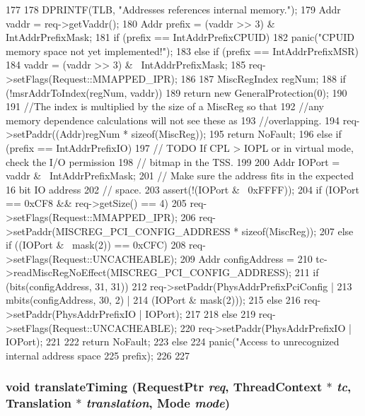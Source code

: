 \begin{DoxyCode}
177 {
178     DPRINTF(TLB, "Addresses references internal memory.\n");
179     Addr vaddr = req->getVaddr();
180     Addr prefix = (vaddr >> 3) & IntAddrPrefixMask;
181     if (prefix == IntAddrPrefixCPUID) {
182         panic("CPUID memory space not yet implemented!\n");
183     } else if (prefix == IntAddrPrefixMSR) {
184         vaddr = (vaddr >> 3) & ~IntAddrPrefixMask;
185         req->setFlags(Request::MMAPPED_IPR);
186 
187         MiscRegIndex regNum;
188         if (!msrAddrToIndex(regNum, vaddr))
189             return new GeneralProtection(0);
190 
191         //The index is multiplied by the size of a MiscReg so that
192         //any memory dependence calculations will not see these as
193         //overlapping.
194         req->setPaddr((Addr)regNum * sizeof(MiscReg));
195         return NoFault;
196     } else if (prefix == IntAddrPrefixIO) {
197         // TODO If CPL > IOPL or in virtual mode, check the I/O permission
198         // bitmap in the TSS.
199 
200         Addr IOPort = vaddr & ~IntAddrPrefixMask;
201         // Make sure the address fits in the expected 16 bit IO address
202         // space.
203         assert(!(IOPort & ~0xFFFF));
204         if (IOPort == 0xCF8 && req->getSize() == 4) {
205             req->setFlags(Request::MMAPPED_IPR);
206             req->setPaddr(MISCREG_PCI_CONFIG_ADDRESS * sizeof(MiscReg));
207         } else if ((IOPort & ~mask(2)) == 0xCFC) {
208             req->setFlags(Request::UNCACHEABLE);
209             Addr configAddress =
210                 tc->readMiscRegNoEffect(MISCREG_PCI_CONFIG_ADDRESS);
211             if (bits(configAddress, 31, 31)) {
212                 req->setPaddr(PhysAddrPrefixPciConfig |
213                         mbits(configAddress, 30, 2) |
214                         (IOPort & mask(2)));
215             } else {
216                 req->setPaddr(PhysAddrPrefixIO | IOPort);
217             }
218         } else {
219             req->setFlags(Request::UNCACHEABLE);
220             req->setPaddr(PhysAddrPrefixIO | IOPort);
221         }
222         return NoFault;
223     } else {
224         panic("Access to unrecognized internal address space %
225                 prefix);
226     }
227 }
\end{DoxyCode}
\hypertarget{classX86ISA_1_1TLB_ae52f7e465748883695d2b4f432a13652}{
\subsubsection[{translateTiming}]{\setlength{\rightskip}{0pt plus 5cm}void translateTiming ({\bf RequestPtr} {\em req}, \/  {\bf ThreadContext} $\ast$ {\em tc}, \/  {\bf Translation} $\ast$ {\em translation}, \/  {\bf Mode} {\em mode})}}
\label{classX86ISA_1_1TLB_ae52f7e465748883695d2b4f432a13652}



